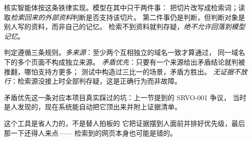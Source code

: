 核实智能体按这条铁律实现。模型在其中只干两件事：
把切片改写成检索词；读取\emph{检索回来的外部资料}判断是否支持该切片。
第二件事仍是判断，但判断对象是别人写的资料，而非自己的记忆。
检索不到资料就判存疑，\emph{绝不允许回落到模型记忆}。

判定遵循三条规则。\emph{多来源}：至少两个互相独立的域名一致才算通过，
同一域名下的多个页面不构成独立来源。
\emph{矛盾优先}：只要有一个来源给出矛盾结论就判被推翻，哪怕支持方更多；
测试中构造过三比一的场景，矛盾方胜出。
\emph{无证据不放行}：检索源没接上时全部判存疑，这是正确行为而非故障。

矛盾优先这一条对应本项目真实踩过的坑：上一节提到的 SRVO-001 争议，
当时是人发现的，现在系统能自动把它顶出来并附上证据清单。

\begin{keynote}{这个工具是省人力的，不是替人拍板的}
它把证据摆到人面前并排好优先级，最后那一下还得人来点——
检索到的网页本身也可能是错的。
\end{keynote}



